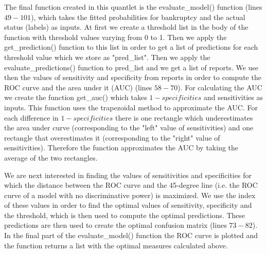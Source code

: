 \documentclass[11pt]{article}
\begin{document}
The final function created in this quantlet is the evaluate\_model() function (lines $49-101$), which takes the fitted probabilities for bankruptcy and the actual status (labels) as inputs. At first we create a threshold list in the body of the function with threshold values varying from 0 to 1. Then we apply the get\_prediction() function to this list in order to get a list of predictions for each threshold value which we store as "pred\_list". Then we apply the evaluate\_predictions() function to pred\_list and we get a list of reports. We use then the values of sensitivity and specificity from reports in order to compute the ROC curve and the area under it (AUC) (lines $58-70$). For calculating the AUC we create the function get\_auc() which takes $1-specificities$ and sensitivities as inputs. This function uses the trapezoidal method to approximate the AUC. For each difference in $1-specificities$ there is one rectangle which underestimates the area under curve (corresponding to the "left" value of sensitivities) and one rectangle that overestimates it (corresponding to the "right" value of sensitivities). Therefore the function approximates the AUC by taking the average of the two rectangles. 

We are next interested in finding the values of sensitivities and specificities for which the distance between the ROC curve and the 45-degree line (i.e. the ROC curve of a model with no discriminative power) is maximized. We use the index of these values in order to find the optimal values of sensitivity, specificity and the threshold, which is then used to compute the optimal predictions. These predictions are then used to create the optimal confusion matrix (lines $73-82$). In the final part of the evaluate\_model() function the ROC curve is plotted and the function returns a list with the optimal measures calculated above.
\end{document}
